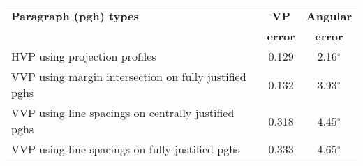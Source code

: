 \begin{table}[t]
  \begin{center}
    \begin{tabular}{|p{95mm}|c|c|}
      \hline
      {\bf Paragraph (pgh) types } & {\bf VP} & {\bf Angular} \\
      {\bf } & {\bf error} & {\bf error} \\  \hline \hline
      HVP using projection profiles & 0.129 & 2.16$^\circ$ \\  \hline
      VVP using margin intersection on fully justified pghs & 0.132 & 3.93$^\circ$ \\ \hline
      VVP using line spacings on centrally justified pghs & 0.318 & 4.45$^\circ$ \\ \hline
      VVP using line spacings on fully justified pghs & 0.333 & 4.65$^\circ$ \\ \hline

\end{tabular}
\end{center}
\end{table}
